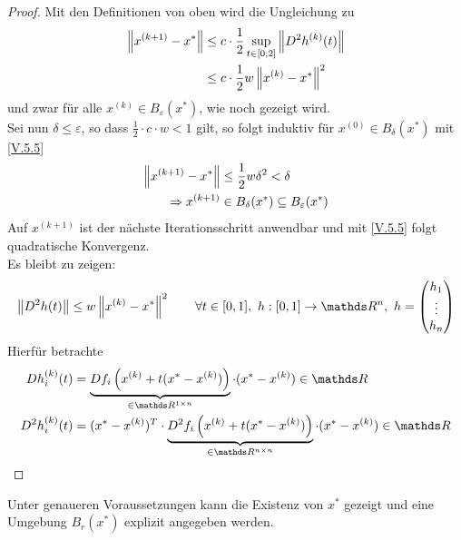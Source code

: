 \begin{proof}
  Mit den Definitionen von oben wird die Ungleichung zu
  \begin{align}\nonumber
    \nn[x^{(k+1)}-x^{*}] &\leq c\cdot \frac{1}{2} \sup_{t\in[0,2]} \nn[D^2h^{(k)}(t)] \\
                         & \leq c\cdot \frac{1}{2} w\nn[x^{(k)}-x^{*}]^2
                           \label{V.5.5}
  \end{align}
  und zwar für alle $x^{(k)}\in B_\varepsilon(x^{*})$, wie noch gezeigt wird.\\
  Sei nun $\delta \leq \varepsilon$, so dass $\frac{1}{2} \cdot c\cdot w <1$ gilt,
  so folgt induktiv für $x^{(0)}\in B_\delta(x^{*})$ mit \eqref{V.5.5}
  \begin{align*}
    \nn[x^{(k+1)}-x^{*}] &\leq \frac{1}{2}w\delta^2 < \delta\\
    \Rightarrow x^{(k+1)}&\in B_\delta(x^{*})\subseteq B_\varepsilon(x^{*})
  \end{align*}
  Auf $x^{(k+1)} $ ist der nächste Iterationsschritt anwendbar
  und mit \eqref{V.5.5} folgt quadratische Konvergenz.\\
  Es bleibt zu zeigen:
  \begin{gather*}
    \nn[D^2h(t)] \leq w\nn[x^{(k)}-x^{*}]^2 \qquad \forall t\in [0,1],~
    h:[0,1]\rightarrow\Ren,~ h=\begin{pmatrix} h_1 \\ \vdots \\ h_n \end{pmatrix}
  \end{gather*}
  Hierfür betrachte
  \begin{align*}
    Dh_i^{(k)}(t)&=\underbrace{Df_i\left( x^{(k)}+t(x^{*}-x^{(k)})\right)}_{\in \R^{1\times n}}
                   \cdot (x^{*}-x^{(k)})\in\R\\
    D^2h_i^{(k)}(t)&=(x^{*}-x^{(k)})^T\cdot
                     \underbrace{D^2f_i\left( x^{(k)}+t(x^{*}-x^{(k)})\right)}_{\in \R^{n\times n}}
                     \cdot (x^{*}-x^{(k)})\in\R\\
  \end{align*}
\end{proof}

Unter genaueren Voraussetzungen kann die Existenz von $x^{*}$ gezeigt 
und eine Umgebung $B_r(x^{*})$ explizit angegeben werden.

